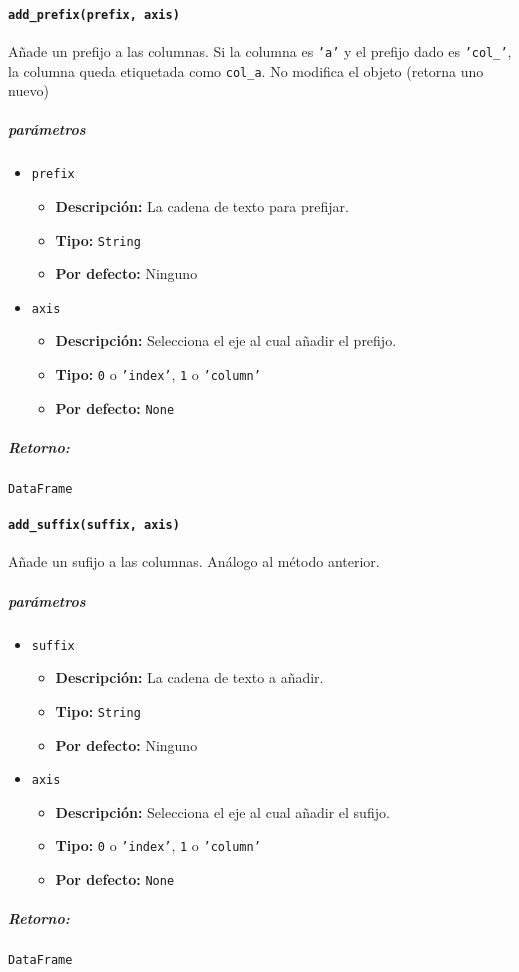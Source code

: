 \paragraph{\texttt{add\_prefix(prefix, axis)}} Añade un prefijo a las columnas. Si la columna es \texttt{'a'} y el prefijo dado es \texttt{'col\_'}, la columna queda etiquetada como \texttt{col\_a}. No modifica el objeto (retorna uno nuevo)
\subparagraph{\textbf{parámetros}}
\begin{itemize}
\item \texttt{prefix}
\begin{itemize}
\item \textbf{Descripción:} La cadena de texto para prefijar.
\item \textbf{Tipo:} \texttt{String}
\item \textbf{Por defecto:} Ninguno
\end{itemize}
\item \texttt{axis}
\begin{itemize}
\item \textbf{Descripción:} Selecciona el eje al cual añadir el prefijo.
\item \textbf{Tipo:}  \texttt{0} o \texttt{'index'}, \texttt{1} o \texttt{'column'}
\item \textbf{Por defecto:} \texttt{None}
\end{itemize}
\end{itemize}
\subparagraph{Retorno:} \texttt{DataFrame}
\paragraph{\texttt{add\_suffix(suffix, axis)}} Añade un sufijo a las columnas. Análogo al método anterior.
\subparagraph{\textbf{parámetros}}
\begin{itemize}
\item \texttt{suffix}
\begin{itemize}
\item \textbf{Descripción:} La cadena de texto a añadir.
\item \textbf{Tipo:} \texttt{String}
\item \textbf{Por defecto:} Ninguno
\end{itemize}
\item \texttt{axis}
\begin{itemize}
\item \textbf{Descripción:} Selecciona el eje al cual añadir el sufijo.
\item \textbf{Tipo:} \texttt{0} o \texttt{'index'}, \texttt{1} o \texttt{'column'}
\item \textbf{Por defecto:} \texttt{None}
\end{itemize}
\end{itemize}
\subparagraph{Retorno:} \texttt{DataFrame}
